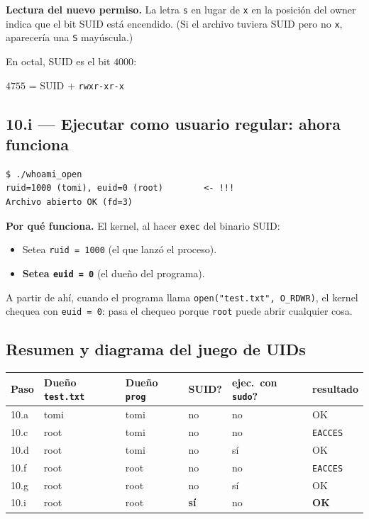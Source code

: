 \documentclass[11pt,a4paper]{article}
\begin{document}
\textbf{Lectura del nuevo permiso.} La letra \texttt{s} en lugar de
\texttt{x} en la posición del owner indica que el bit SUID está
encendido. (Si el archivo tuviera SUID pero no \texttt{x}, aparecería
una \texttt{S} mayúscula.)

En octal, SUID es el bit $4000$:

\quad $4755$ = SUID + \texttt{rwxr-xr-x}

\subsection*{10.i --- Ejecutar como usuario regular: ahora funciona}

\begin{lstlisting}[style=shellstyle]
$ ./whoami_open
ruid=1000 (tomi), euid=0 (root)        <- !!!
Archivo abierto OK (fd=3)
\end{lstlisting}

\textbf{Por qué funciona.} El kernel, al hacer \texttt{exec} del
binario SUID:

\begin{itemize}[leftmargin=*,nosep]
    \item Setea \texttt{ruid = 1000} (el que lanzó el proceso).
    \item \textbf{Setea \texttt{euid = 0}} (el dueño del programa).
\end{itemize}

A partir de ahí, cuando el programa llama \texttt{open("test.txt",
O\_RDWR)}, el kernel chequea con \texttt{euid = 0}: pasa el chequeo
porque \texttt{root} puede abrir cualquier cosa.

\subsection*{Resumen y diagrama del juego de UIDs}

\begin{center}
\small
\begin{tabular}{@{}llllll@{}}
\toprule
Paso & Dueño \texttt{test.txt} & Dueño \texttt{prog} & SUID? & ejec.\ con \texttt{sudo}? & resultado \\
\midrule
10.a & tomi & tomi & no & no  & OK \\
10.c & root & tomi & no & no  & \texttt{EACCES} \\
10.d & root & tomi & no & sí  & OK \\
10.f & root & root & no & no  & \texttt{EACCES} \\
10.g & root & root & no & sí  & OK \\
10.i & root & root & \textbf{sí} & no & \textbf{OK} \\
\bottomrule
\end{tabular}
\end{center}
\end{document}

